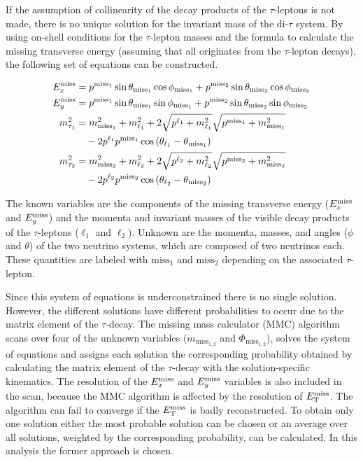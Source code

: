 If the assumption of collinearity of the decay products of the $\tau$-leptons is not made, there
is no unique solution for the invariant mass of the di-$\tau$ system.
By using on-shell conditions for the $\tau$-lepton masses and the formula to calculate the
missing transverse energy (assuming that all \etmiss{} originates from the $ \tau$-lepton decays),
the following set of equations can be constructed.

\begin{equation}
    \label{eq:mmc:equations}
    \begin{aligned}
        E_x^\text{miss} &= p^{\text{miss}_1} \sin \theta_{\text{miss}_1} \cos \phi_{\text{miss}_1} + p^{\text{miss}_2} \sin \theta_{\text{miss}_2} \cos \phi_{\text{miss}_2} \\
        E_y^\text{miss} &= p^{\text{miss}_1} \sin \theta_{\text{miss}_1} \sin \phi_{\text{miss}_1} + p^{\text{miss}_2} \sin \theta_{\text{miss}_2} \sin \phi_{\text{miss}_2} \\
        m_{\tau_1}^2 &= m_{\text{miss}_1}^2 + m_{\ell_1}^2 + 2 \sqrt{p^{\ell_1} + m_{\ell_1}^2} \sqrt{p^{\text{miss}_1} + m_{\text{miss}_1}^2} \\ 
                     & \quad - 2 p^{\ell_1} p^{\text{miss}_1} \cos{(\theta_{\ell_1} - \theta_{\text{miss}_1})} \\
        m_{\tau_2}^2 &= m_{\text{miss}_2}^2 + m_{\ell_2}^2 + 2 \sqrt{p^{\ell_2} + m_{\ell_2}^2} \sqrt{p^{\text{miss}_2} + m_{\text{miss}_2}^2}\\
                     & \quad - 2 p^{\ell_2} p^{\text{miss}_2} \cos{(\theta_{\ell_2} - \theta_{\text{miss}_2})}
    \end{aligned}
\end{equation}

The known variables are the components of the missing transverse energy ($E_x^\text{miss}$ and $E_y^\text{miss}$)
and the momenta and invariant masses of the visible decay products of the $\tau$-leptons ($\ell_1$ and $\ell_2$).
Unknown are the momenta, masses, and angles ($\phi$ and $\theta$) of the two neutrino systems, which are composed of two neutrinos each.
These quantities are labeled with $\text{miss}_1$ and $\text{miss}_2$ depending on the associated $\tau$-lepton.

Since this system of equations is underconstrained there is no single solution.
However, the different solutions have different probabilities to occur due to the matrix element of the $\tau$-decay.
The missing mass calculator (MMC) algorithm~\cite{MMC} scans over four of the unknown variables ($m_{\text{miss}_{1,2}}$ and $\Phi_{\text{miss}_{1,2}}$),
solves the system of equations and assigns each solution the corresponding probability obtained by calculating the matrix
element of the $\tau$-decay with the solution-specific kinematics.
The resolution of the $E_x^\text{miss}$ and $E_y^\text{miss}$ variables is also included in the scan, because the MMC algorithm
is affected by the resolution of $E_\text{T}^\text{miss}$.
The algorithm can fail to converge if the $E_\text{T}^\text{miss}$ is badly reconstructed.
To obtain only one solution either the most probable solution can be chosen or an average over all solutions,
weighted by the corresponding probability, can be calculated.
In this analysis the former approach is chosen.



